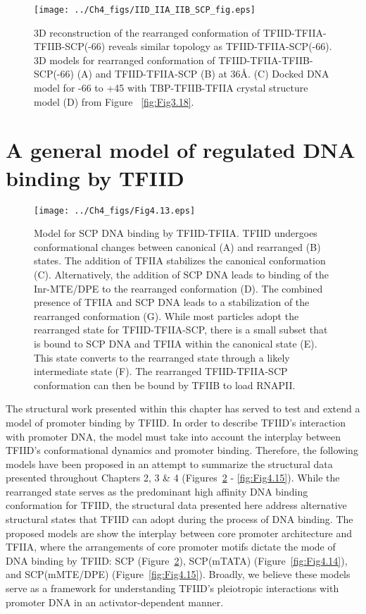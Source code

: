 \begin{figure}
\centering
\texttt{[image: ../Ch4\_figs/IID\_IIA\_IIB\_SCP\_fig.eps]}
\caption[3D reconstruction of the rearranged conformation of TFIID-TFIIA-TFIIB-SCP(-66) reveals similar topology as TFIID-TFIIA-SCP(-66)]{3D reconstruction of the rearranged conformation of TFIID-TFIIA-TFIIB-SCP(-66) reveals similar topology as TFIID-TFIIA-SCP(-66). 3D models for rearranged conformation of TFIID-TFIIA-TFIIB-SCP(-66) (A) and TFIID-TFIIA-SCP (B) at 36\AA. (C) Docked DNA model for -66 to +45 with TBP-TFIIB-TFIIA crystal structure model (D) from Figure ~\ref{fig:Fig3.18}. }
\label{fig:IIB_cryo}
\end{figure}

\section{A general model of regulated DNA binding by TFIID}
\begin{figure}
\centering
\texttt{[image: ../Ch4\_figs/Fig4.13.eps]}
\caption[Model for SCP DNA binding by TFIID-TFIIA]{Model for SCP DNA binding by TFIID-TFIIA. TFIID undergoes conformational changes between canonical (A) and rearranged (B) states. The addition of TFIIA stabilizes the canonical conformation (C). Alternatively, the addition of SCP DNA leads to binding of the Inr-MTE/DPE to the rearranged conformation (D).  The combined presence of TFIIA and SCP DNA leads to a stabilization of the rearranged conformation (G).  While most particles adopt the rearranged state for TFIID-TFIIA-SCP, there is a small subset that is bound to SCP DNA and TFIIA within the canonical state (E). This state converts to the rearranged state through a likely intermediate state (F). The rearranged TFIID-TFIIA-SCP conformation can then be bound by TFIIB to load RNAPII.}
\label{fig:Fig4.13}
\end{figure}

The structural work presented within this chapter has served to test and extend a model of promoter binding by TFIID. In order to describe TFIID's interaction with promoter DNA, the model must take into account the interplay between TFIID's conformational dynamics and promoter binding. Therefore, the following models have been proposed in an attempt to summarize the structural data presented throughout Chapters 2, 3 \& 4 (Figures~\ref{fig:Fig4.13} - \ref{fig:Fig4.15}). While the rearranged state serves as the predominant high affinity DNA binding conformation for TFIID, the structural data presented here address alternative structural states that TFIID can adopt during the process of DNA binding. The proposed models are show the interplay between core promoter architecture and TFIIA, where the arrangements of core promoter motifs dictate the mode of DNA binding by TFIID: SCP (Figure~\ref{fig:Fig4.13}), SCP(mTATA) (Figure~\ref{fig:Fig4.14}), and SCP(mMTE/DPE) (Figure~\ref{fig:Fig4.15}). Broadly, we believe these models serve as a framework for understanding TFIID's pleiotropic interactions with promoter DNA in an activator-dependent manner.\\

